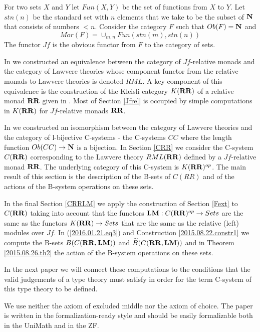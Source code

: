 \documentclass[12pt]{amsart}
\newcommand{\sr}{\rightarrow}
\newcommand{\nn}{{\bf N\rm}}
\newcommand{\nat}{\nn}
\newcommand{\wt}{\widetilde}
\newcommand{\RR}{{\bf RR}}
\newcommand{\LM}{{\bf LM}}
\begin{document}
For two sets $X$ and $Y$ let $Fun(X,Y)$ be the set of functions from $X$ to $Y$.  Let $stn(n)$ be the standard set with $n$ elements that we take to be the subset of $\nat$ that consists of numbers $<n$. Consider the category $F$ such that $Ob(F)=\nn$ and
%
$$Mor(F)=\cup_{m,n}Fun(stn(m),stn(n))$$
%
The functor $Jf$ is the obvious functor from $F$ to the category of sets. 

In \cite{LandJf} we constructed an equivalence between the category of $Jf$-relative monads and the category of Lawvere theories whose component functor from the relative monads to Lawvere theories is denoted $RML$. A key component of this equivalence is the construction of the Kleisli category $K(\RR)$ of a relative monad $\RR$ given in \cite{ACU2}.  Most of Section \ref{Jfrel} is occupied by simple computations in $K(\RR)$ for $Jf$-relative monads $\RR$.

In \cite{LandC} we constructed an isomorphism between the category of Lawvere theories and the category of l-bijective C-systems - the C-systems $CC$ where the length function $Ob(CC)\sr \nat$ is a bijection. In Section \ref{CRR} we consider the C-system $C(\RR)$ corresponding to the Lawvere theory $RML(\RR)$ defined by a $Jf$-relative monad $\RR$. The underlying category of this C-system is $K(\RR)^{op}$. The main result of this section is the description of the B-sets of $C(RR)$ and of the actions of the B-system operations on these sets.

In the final Section \ref{CRRLM} we apply the construction of Section \ref{Fext} to $C(\RR)$ taking into account that the functors $\LM:C(\RR)^{op}\sr Sets$ are the same as the functors $K(\RR)\sr Sets$ that are the same as the relative (left) modules over $Jf$. In (\ref{2016.01.21.eq3}) and Construction \ref{2015.08.22.constr1} we compute the B-sets $B(C(\RR,\LM))$ and $\wt{B}(C(\RR,\LM))$ and in Theorem \ref{2015.08.26.th2} the action of the B-system operations on these sets. 

In the next paper we will connect these computations to the conditions that the valid judgements of a type theory must satisfy in order for the term C-system of this type theory to be defined. 

\vspace{5mm}

We use neither the axiom of excluded middle nor the axiom of choice. The paper is written in the formalization-ready style and should be easily formalizable both in the UniMath and in the ZF. 

\vspace{5mm}
\end{document}
